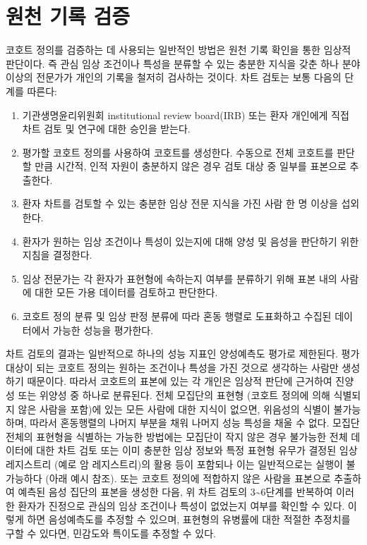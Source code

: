 \documentclass[10.5pt]{book}
\providecommand{\tightlist}{%
  \setlength{\itemsep}{0pt}\setlength{\parskip}{0pt}}
\theoremstyle{definition}
\theoremstyle{definition}
\theoremstyle{definition}
\theoremstyle{remark}
\begin{document}
\section{원천 기록 검증}\label{--}


코호트 정의를 검증하는 데 사용되는 일반적인 방법은 원천 기록 확인을 통한
임상적 판단이다. 즉 관심 임상 조건이나 특성을 분류할 수 있는 충분한
지식을 갖춘 하나 분야 이상의 전문가가 개인의 기록을 철저히 검사하는
것이다. 차트 검토는 보통 다음의 단계를 따른다:

\begin{enumerate}
\def\labelenumi{\arabic{enumi}.}
\tightlist
\item
  기관생명윤리위원회 institutional review board(IRB) 또는 환자 개인에게
  직접 차트 검토 및 연구에 대한 승인을 받는다.
\item
  평가할 코호트 정의를 사용하여 코호트를 생성한다. 수동으로 전체
  코호트를 판단할 만큼 시간적, 인적 자원이 충분하지 않은 경우 검토 대상
  중 일부를 표본으로 추출한다.
\item
  환자 차트를 검토할 수 있는 충분한 임상 전문 지식을 가진 사람 한 명
  이상을 섭외한다.
\item
  환자가 원하는 임상 조건이나 특성이 있는지에 대해 양성 및 음성을
  판단하기 위한 지침을 결정한다.
\item
  임상 전문가는 각 환자가 표현형에 속하는지 여부를 분류하기 위해 표본
  내의 사람에 대한 모든 가용 데이터를 검토하고 판단한다.
\item
  코호트 정의 분류 및 임상 판정 분류에 따라 혼동 행렬로 도표화하고
  수집된 데이터에서 가능한 성능을 평가한다.
\end{enumerate}

차트 검토의 결과는 일반적으로 하나의 성능 지표인 양성예측도 평가로
제한된다. 평가 대상이 되는 코호트 정의는 원하는 조건이나 특성을 가진
것으로 생각하는 사람만 생성하기 때문이다. 따라서 코호트의 표본에 있는 각
개인은 임상적 판단에 근거하여 진양성 또는 위양성 중 하나로 분류된다.
전체 모집단의 표현형 (코호트 정의에 의해 식별되지 않은 사람을 포함)에
있는 모든 사람에 대한 지식이 없으면, 위음성의 식별이 불가능하며, 따라서
혼동행렬의 나머지 부분을 채워 나머지 성능 특성을 채울 수 없다. 모집단
전체의 표현형을 식별하는 가능한 방법에는 모집단이 작지 않은 경우
불가능한 전체 데이터에 대한 차트 검토 또는 이미 충분한 임상 정보와 특정
표현형 유무가 결정된 임상 레지스트리 (예로 암 레지스트리)의 활용 등이
포함되나 이는 일반적으로는 실행이 불가능하다 (아래 예시 참조). 또는
코호트 정의에 적합하지 않은 사람을 표본으로 추출하여 예측된 음성 집단의
표본을 생성한 다음, 위 차트 검토의 3\textasciitilde{}6단계를 반복하여
이러한 환자가 진정으로 관심의 임상 조건이나 특성이 없었는지 여부를
확인할 수 있다. 이렇게 하면 음성예측도를 추정할 수 있으며, 표현형의
유병률에 대한 적절한 추정치를 구할 수 있다면, 민감도와 특이도를 추정할
수 있다.
\end{document}
